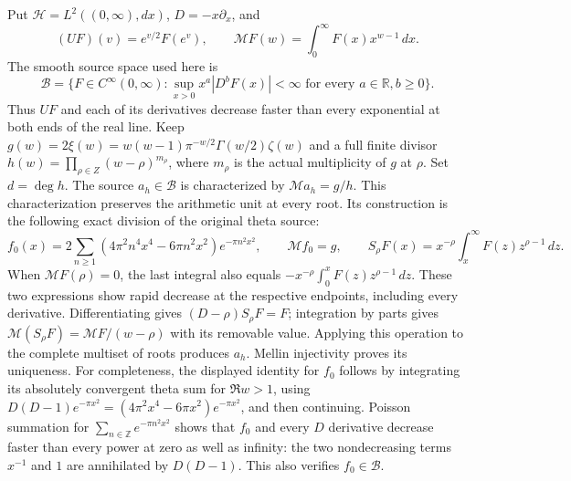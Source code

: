 \documentclass[11pt]{article}
\theoremstyle{remark}\newtheorem{remark}[theorem]{Remark}
\begin{document}
Put $\mathcal H=L^2((0,\infty),dx)$, $D=-x\partial_x$, and
\[
 (UF)(v)=e^{v/2}F(e^v),\qquad
 \mathcal M F(w)=\int_0^\infty F(x)x^{w-1}\,dx.
\]
The smooth source space used here is
\[
 \mathscr B=\{F\in C^\infty(0,\infty):
       \sup_{x>0}x^a|D^bF(x)|<\infty
       \text{ for every }a\in\mathbb R, b\geq0\}.
\]
Thus $UF$ and each of its derivatives decrease faster than every
exponential at both ends of the real line.  Keep
$g(w)=2\xi(w)=w(w-1)\pi^{-w/2}\Gamma(w/2)\zeta(w)$ and a full finite
divisor $h(w)=\prod_{\rho\in Z}(w-\rho)^{m_\rho}$, where $m_\rho$
is the actual multiplicity of $g$ at $\rho$.  Set $d=\deg h$.
The source $a_h\in\mathscr B$ is characterized by
$\mathcal M a_h=g/h$.  This characterization preserves the arithmetic
unit at every root.  Its construction is the following exact division
of the original theta source:
\[
 f_0(x)=2\sum_{n\geq1}(4\pi^2 n^4x^4-6\pi n^2x^2)e^{-\pi n^2x^2},
 \qquad \mathcal M f_0=g,
 \qquad
 S_\rho F(x)=x^{-\rho}\int_x^\infty F(z)z^{\rho-1}\,dz.
\]
When $\mathcal M F(\rho)=0$, the last integral also equals
$-x^{-\rho}\int_0^xF(z)z^{\rho-1}\,dz$.  These two expressions show
rapid decrease at the respective endpoints, including every derivative.
Differentiating gives $(D-\rho)S_\rho F=F$; integration by parts gives
$\mathcal M(S_\rho F)=\mathcal M F/(w-\rho)$ with its removable value.
Applying this operation to the complete multiset of roots produces
$a_h$.  Mellin injectivity proves its uniqueness.  For completeness,
the displayed identity for $f_0$ follows by integrating its absolutely
convergent theta sum for $\Re w>1$, using
$D(D-1)e^{-\pi x^2}=(4\pi^2x^4-6\pi x^2)e^{-\pi x^2}$,
and then continuing.  Poisson summation for
$\sum_{n\in\mathbb Z}e^{-\pi n^2x^2}$ shows that $f_0$ and every
$D$ derivative decrease faster than every power at zero as well as
infinity: the two nondecreasing terms $x^{-1}$ and $1$ are annihilated
by $D(D-1)$.  This also verifies $f_0\in\mathscr B$.
\end{document}
